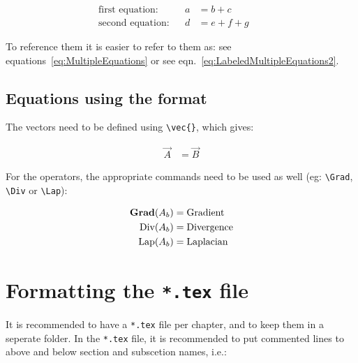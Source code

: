 \begin{subequations}
\label{eq:LabeledMultipleEquations}
\begin{align}
\text{first equation:}&&
a &= b+c
&&
\\
\text{second equation:}&&
d &= e+f+g
&&
\label{eq:LabeledMultipleEquations2}
\end{align}
\end{subequations}

To reference them it is easier to refer to them as: see equations~\ref{eq:MultipleEquations} or see eqn.~\eqref{eq:LabeledMultipleEquations2}.

\subsection{Equations using the \texorpdfstring{\telemacsystem{}}{Telemac} format}

The vectors need to be defined using \verb+\vec{}+, which gives:

\begin{align}
\vec{A} &= \vec{B}
\end{align}

For the operators, the appropriate commands need to be used as well (eg: \verb+\Grad+, \verb+\Div+ or \verb+\Lap+):

\begin{align}
\text{\bfseries{Grad}}(A_b) &= \text{Gradient}
\\
\text{Div}(A_b) &= \text{Divergence}
\\
\text{Lap}(A_b) &= \text{Laplacian}
\end{align}


\section{Formatting the \texorpdfstring{\texttt{*.tex}}{tex} file}

It is recommended to have a \texttt{*.tex} file per chapter, and to keep them in a seperate folder. In the \texttt{*.tex} file, it is recommended to
put commented lines to above and below section and subscetion names, i.e.:

